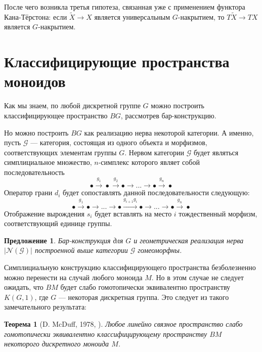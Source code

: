\documentclass[14pt, dvipsnames]{extarticle}
\newtheorem{theorem}{Теорема}
\newtheorem{proposition}{Предложение}
\theoremstyle{definition}
\theoremstyle{remark}
\begin{document}
После чего возникла третья гипотеза, связанная уже с применением функтора Кана-Тёрстона: если $\widetilde{X}\to X$ является универсальным $G$-накрытием, то $T\widetilde{X}\to TX$ является $G$-накрытием.










\section{Классифицирующие пространства моноидов}

Как мы знаем, по любой дискретной группе $G$ можно построить классифицирующее пространство $BG$, рассмотрев бар-конструкцию. 

Но можно построить $BG$ как реализацию нерва некоторой категории. А именно, пусть $\mathscr{G}$ --- категория, состоящая из одного объекта и морфизмов, соответствующих элементам группы $G$. Нервом категории $\mathscr{G}$ будет являться симплициальное множество, $n$-симплекс которого являет собой последовательность $$\bullet \stackrel{g_{1}}{\to} \bullet \stackrel{g_{2}}{\to} \bullet\to ... \to \bullet \stackrel{g_{n}}{\to}\bullet$$ Оператор грани $d_i$ будет сопоставлять данной последовательности следующую: $$\bullet \stackrel{g_{1}}{\to}\bullet\to...\to \bullet \stackrel{g_{i+1}g_i}{\to}\bullet\to  ...\to \bullet \stackrel{g_{n}}{\to}\bullet$$ Отображение вырождения $s_i$ будет вставлять на место $i$ тождественный морфизм, соответствующий единице группы.

\begin{proposition}
Бар-конструкция для $G$ и геометрическая реализация нерва $|\mathcal{N}(\mathscr{G})|$ построенной выше категории $\mathscr{G}$ гомеоморфны.
\end{proposition} 

Симплициальную конструкцию классифицирующего пространства безболезненно можно перенести на случай любого моноида $M$. Но в этом случае не следует ожидать, что $BM$ будет слабо гомотопически эквивалентно пространству $K(G, 1)$, где $G$ --- некоторая дискретная группа. Это следует из такого замечательного результата:

\begin{theorem}[D. McDuff, 1978, \cite{McDuff}]
Любое линейно связное пространство слабо гомотопически эквивалентно классифицирующему пространству $BM$ некоторого дискретного моноида $M$. 
\end{theorem}
\end{document}
